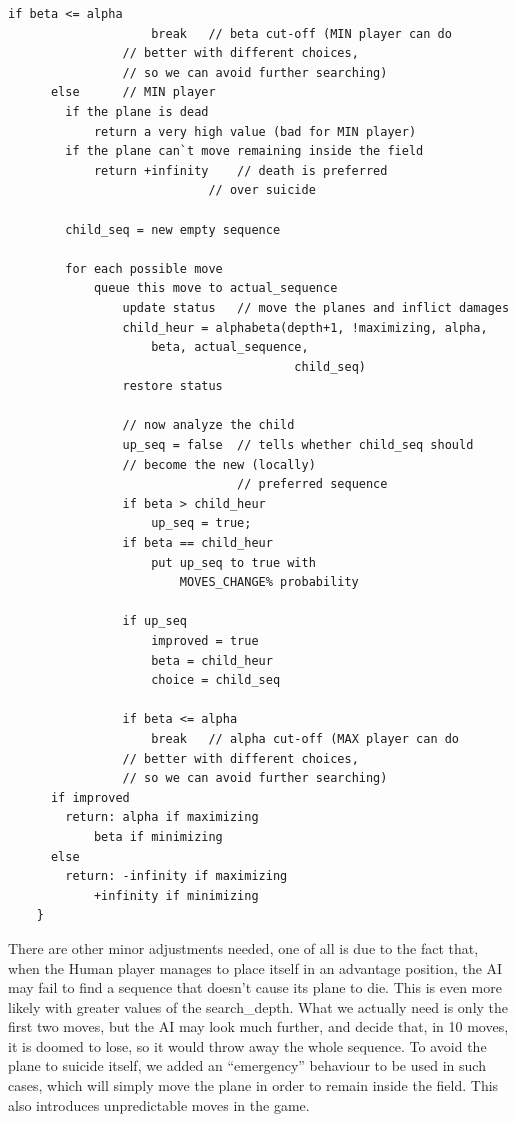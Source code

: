 {\begin{lstlisting}[frame=shadowbox,breaklines]
                if beta <= alpha
                	break	// beta cut-off (MIN player can do
				// better with different choices,
				// so we can avoid further searching)
      else		// MIN player
      	if the plane is dead
        	return a very high value (bad for MIN player)
        if the plane can`t move remaining inside the field
        	return +infinity	// death is preferred
                			// over suicide
        
        child_seq = new empty sequence
        
        for each possible move
        	queue this move to actual_sequence
                update status	// move the planes and inflict damages
                child_heur = alphabeta(depth+1, !maximizing, alpha,
					beta, actual_sequence,
                                        child_seq)
                restore status
        	
                // now analyze the child
                up_seq = false	// tells whether child_seq should
				// become the new (locally)
                                // preferred sequence
                if beta > child_heur
                	up_seq = true;
                if beta == child_heur
                	put up_seq to true with
                        MOVES_CHANGE% probability
                        
                if up_seq
                	improved = true
                	beta = child_heur
                	choice = child_seq
                
                if beta <= alpha
                	break	// alpha cut-off (MAX player can do
				// better with different choices,
				// so we can avoid further searching)
      if improved
      	return:	alpha if maximizing
        	beta if minimizing
      else
      	return:	-infinity if maximizing
        	+infinity if minimizing
    }
  \end{lstlisting}
}

There are other minor adjustments needed, one of all is due to the fact that, when the Human player manages to place itself in an advantage position, the AI may fail to find a sequence that doesn't cause its plane to die. This is even more likely with greater values of the search\_depth. What we actually need is only the first two moves, but the AI may look much further, and decide that, in 10 moves, it is doomed to lose, so it would throw away the whole sequence.
To avoid the plane to suicide itself, we added an ``emergency'' behaviour to be used in such cases, which will simply move the plane in order to remain inside the field. This also introduces unpredictable moves in the game.
